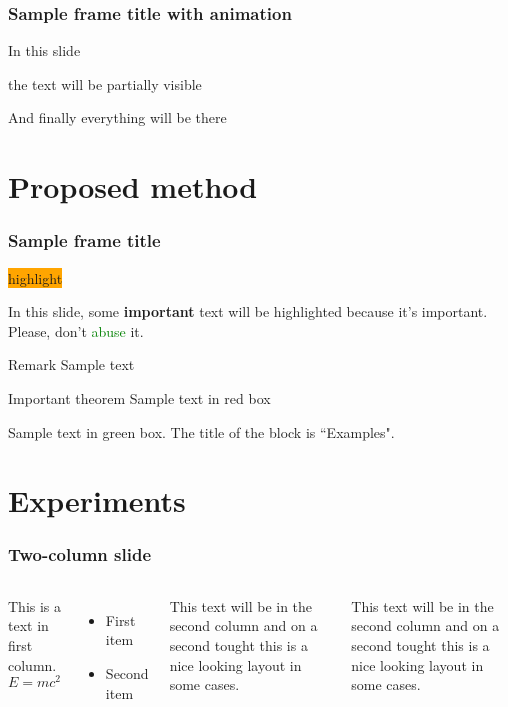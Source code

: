 \documentclass[14pt]{beamer}
\begin{document}
\begin{frame}
\frametitle{Sample frame title with animation}
 In this slide \pause

 the text will be partially visible \pause

 And finally everything will be there
\end{frame}

\section{Proposed method}
\begin{frame}
\frametitle{Sample frame title}

\colorbox{orange}{highlight}

In this slide, some \textbf{important} text will be
\alert{highlighted} because it's important.
Please, don't \textcolor{green}{abuse} it. 

\begin{block}{Remark}
Sample text
\end{block}

\begin{alertblock}{Important theorem}
Sample text in red box
\end{alertblock}

\begin{examples}
Sample text in green box. The title of the block is ``Examples".
\end{examples}

\end{frame}


\section{Experiments}

\begin{frame}
\frametitle{Two-column slide}

\begin{columns}

This is a text in first column.
$$E=mc^2$$
\begin{itemize}
\item First item
\item Second item
\end{itemize}

This text will be in the second column
and on a second tought this is a nice looking
layout in some cases.

This text will be in the second column
and on a second tought this is a nice looking
layout in some cases.

\end{columns}
\end{frame}
\end{document}
